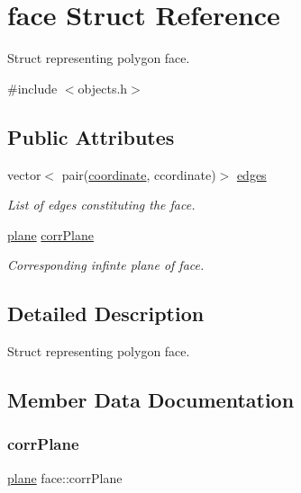 \hypertarget{structface}{}\section{face Struct Reference}
\label{structface}


Struct representing polygon face.  




{\ttfamily \#include $<$objects.\+h$>$}

\subsection*{Public Attributes}
\begin{DoxyCompactItemize}
\item 
vector$<$ pair(\mbox{\hyperlink{structcoordinate}{coordinate}}, ccordinate)$>$ \mbox{\hyperlink{structface_a1cf1b3986e4c89375190db575cc537d2}{edges}}
\begin{DoxyCompactList}\small\item\em List of edges constituting the face. \end{DoxyCompactList}\item 
\mbox{\hyperlink{structplane}{plane}} \mbox{\hyperlink{structface_a2418c9e63fc00634c71d3b73b61aed3b}{corr\+Plane}}
\begin{DoxyCompactList}\small\item\em Corresponding infinte plane of face. \end{DoxyCompactList}\end{DoxyCompactItemize}


\subsection{Detailed Description}
Struct representing polygon face. 

\subsection{Member Data Documentation}
\mbox{\label{structface_a2418c9e63fc00634c71d3b73b61aed3b}} 
\subsubsection{\texorpdfstring{corr\+Plane}{corrPlane}}
{\footnotesize\ttfamily \mbox{\hyperlink{structplane}{plane}} face\+::corr\+Plane}



